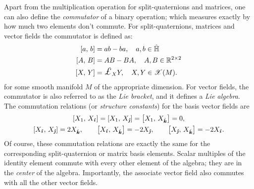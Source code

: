 Apart from the multiplication operation for split-quaternions and matrices, one can also define the \emph{commutator} of a binary operation; which measures exactly by how much two elements don't commute. For split-quaternions, matrices and vector fields the commutator is defined as: 
\begin{equation}
    \begin{split}
        \liebr{a}{b} &= ab - ba,\quad a, b \in \spquaternions \\
        \liebr{A}{B} &= AB - BA,\quad A, B \in \real^{2\times 2} \\
        \liebr{X}{Y} &= \lied{X}{Y},\quad X,Y\in \vfields{M}.
    \end{split}
\end{equation}
for some smooth manifold $M$ of the appropriate dimension. For vector fields, the commutator is also referred to as the \emph{Lie bracket}, and it defines a \emph{Lie algebra}. The commutation relations (or \emph{structure constants}) for the basis vector fields are \cite{Schuller2014}
\begin{gather}
    \liebr{X_1}{X_{\quati}} = \liebr{X_1}{X_{\quatj}} = \liebr{X_1}{X_{\quatk}} = 0, \\
    \liebr{X_{\quati}}{X_{\quatj}} = 2X_{\quatk}, \qquad  
    \liebr{X_{\quati}}{X_{\quatk}} = -2X_{\quatj}, \qquad
    \liebr{X_{\quatj}}{X_{\quatk}} = -2X_{\quati}.
\end{gather}
Of course, these commutation relations are exactly the same for the corresponding split-quaternion or matrix basis elements. Scalar multiples of the identity element commute with every other element of the algebra; they are in the \emph{center} of the algebra. Importantly, the associate vector field also commutes with all the other vector fields. 

